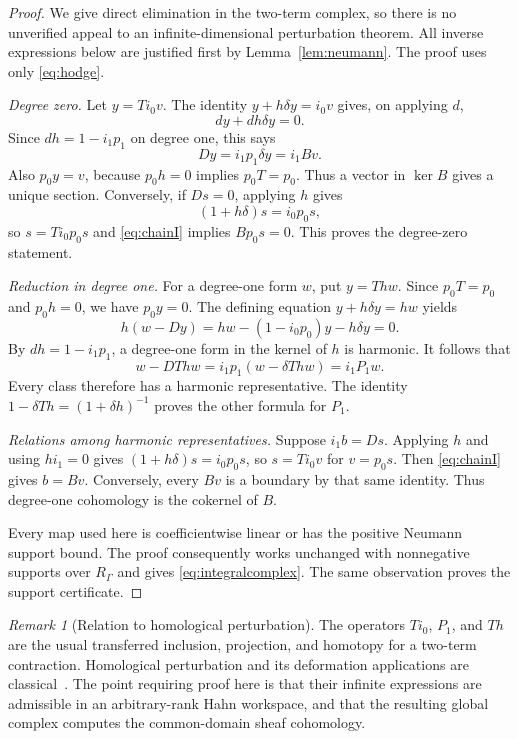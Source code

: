 \documentclass[11pt,letterpaper]{article}
\numberwithin{equation}{section}
\theoremstyle{definition}
\theoremstyle{remark}
\newtheorem{remark}[theorem]{Remark}
\newcommand{\rg}{R_\Gamma}
\begin{document}
\begin{proof}
We give direct elimination in the two-term complex, so there is no
unverified appeal to an infinite-dimensional perturbation theorem.
All inverse expressions below are justified first by
Lemma~\ref{lem:neumann}. The proof uses only \eqref{eq:hodge}.

\emph{Degree zero.} Let $y=Ti_0v$. The identity
$y+h\delta y=i_0v$ gives, on applying $d$,
\[
 dy+dh\delta y=0.
\]
Since $dh=1-i_1p_1$ on degree one, this says
\begin{equation}
 Dy=i_1p_1\delta y=i_1Bv.
 \label{eq:chainI}
\end{equation}
Also $p_0y=v$, because $p_0h=0$ implies $p_0T=p_0$.
Thus a vector in $\ker B$ gives a unique section.
Conversely, if $Ds=0$, applying $h$ gives
\[
 (1+h\delta)s=i_0p_0s,
\]
so $s=Ti_0p_0s$ and \eqref{eq:chainI} implies $Bp_0s=0$.
This proves the degree-zero statement.

\emph{Reduction in degree one.} For a degree-one form $w$, put
$y=T h w$. Since $p_0T=p_0$ and $p_0h=0$, we have $p_0y=0$.
The defining equation $y+h\delta y=hw$ yields
\[
 h(w-Dy)=hw-(1-i_0p_0)y-h\delta y=0.
\]
By $dh=1-i_1p_1$, a degree-one form in the kernel of $h$ is harmonic.
It follows that
\begin{equation}
 w-DThw=i_1p_1(w-\delta Thw)=i_1P_1w.
 \label{eq:eliminate}
\end{equation}
Every class therefore has a harmonic representative. The identity
$1-\delta T h=(1+\delta h)^{-1}$ proves the other formula for $P_1$.

\emph{Relations among harmonic representatives.} Suppose $i_1b=Ds$.
Applying $h$ and using $hi_1=0$ gives
$(1+h\delta)s=i_0p_0s$, so $s=Ti_0v$ for $v=p_0s$.
Then \eqref{eq:chainI} gives $b=Bv$. Conversely, every $Bv$ is a
boundary by that same identity. Thus degree-one cohomology is the
cokernel of $B$.

Every map used here is coefficientwise linear or has the positive
Neumann support bound. The proof consequently works unchanged with
nonnegative supports over $\rg$ and gives \eqref{eq:integralcomplex}.
The same observation proves the support certificate.
\end{proof}

\begin{remark}[Relation to homological perturbation]
The operators $Ti_0$, $P_1$, and $Th$ are the usual transferred
inclusion, projection, and homotopy for a two-term contraction.
Homological perturbation and its deformation applications are
classical~\cite{crainic,greenlazarsfeld}. The point requiring proof here
is that their infinite expressions are admissible in an arbitrary-rank
Hahn workspace, and that the resulting global complex computes the
common-domain sheaf cohomology.
\end{remark}
\end{document}
